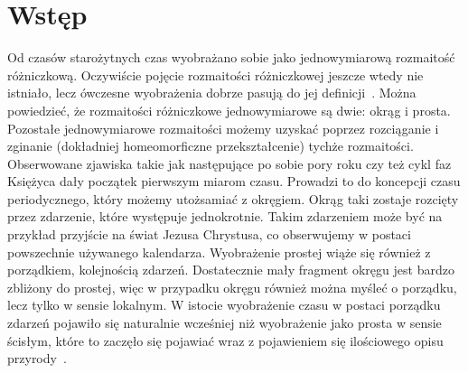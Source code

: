 \newpage
\section{Wstęp}
Od czasów starożytnych czas wyobrażano sobie jako jednowymiarową
rozmaitość różniczkową. 
Oczywiście pojęcie rozmaitości różniczkowej jeszcze wtedy nie istniało, 
lecz ówczesne wyobrażenia dobrze pasują do jej 
definicji~\cite{heller1993fizyka}. 
Można powiedzieć, że rozmaitości różniczkowe 
 jednowymiarowe są dwie: okrąg i prosta. 
Pozostałe jednowymiarowe rozmaitości możemy uzyskać 
poprzez rozciąganie i zginanie 
(dokładniej homeomorficzne przekształcenie) 
tychże rozmaitości.
Obserwowane zjawiska takie jak 
następujące po sobie pory roku czy też cykl faz 
Księżyca dały początek pierwszym miarom czasu. 
Prowadzi to do koncepcji czasu periodycznego, który możemy 
utożsamiać z okręgiem. 
Okrąg taki zostaje rozcięty przez zdarzenie, które występuje 
jednokrotnie. Takim zdarzeniem może być na przykład 
przyjście na świat Jezusa Chrystusa, co 
obserwujemy w postaci powszechnie 
używanego kalendarza. 
Wyobrażenie prostej wiąże się również z porządkiem, 
kolejnością zdarzeń. 
Dostatecznie mały fragment okręgu jest bardzo zbliżony do
prostej, więc w przypadku okręgu również można myśleć o
 porządku, lecz tylko w sensie lokalnym. 
W istocie wyobrażenie czasu w postaci porządku zdarzeń
pojawiło się naturalnie wcześniej niż wyobrażenie jako prosta 
w sensie ścisłym, które to zaczęło się pojawiać wraz 
z pojawieniem się ilościowego opisu przyrody~\cite{czasHeller}.


